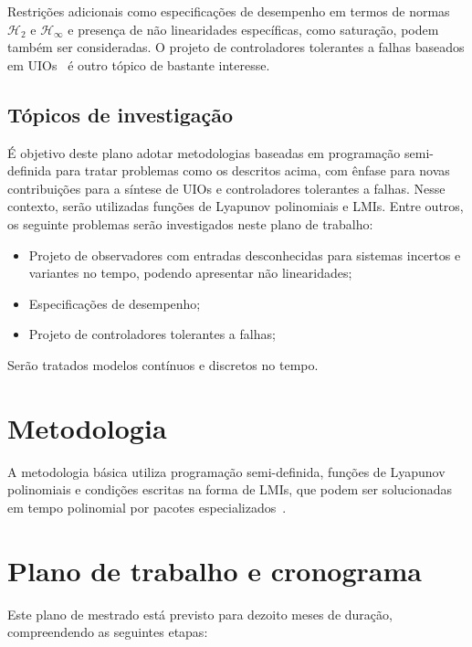 \documentclass[11pt,a4paper]{article}
\begin{document}
Restrições adicionais como especificações de desempenho em termos de
normas $\mathcal{H}_2$ e $\mathcal{H}_\infty$ e presença de não
linearidades específicas, como saturação, podem também ser
consideradas. O projeto de controladores tolerantes a falhas baseados
em UIOs~\cite{BFKPS:00,BSW:01,YCY:05,CH:16} é outro tópico de bastante
interesse.

\subsection{Tópicos de investigação}

É objetivo deste plano adotar metodologias baseadas em programação
semi-definida para tratar problemas como os descritos acima, com
ênfase para novas contribuições para a síntese de UIOs e controladores
tolerantes a falhas. Nesse contexto, serão utilizadas funções de
Lyapunov polinomiais e LMIs. Entre outros, os seguinte problemas serão
investigados neste plano de trabalho:
\begin{itemize}
\item Projeto de observadores com entradas desconhecidas para sistemas
  incertos e variantes no tempo, podendo apresentar não linearidades;

\item Especificações de desempenho;
  
\item Projeto de controladores tolerantes a falhas;
\end{itemize}
Serão tratados modelos contínuos e discretos no tempo.

\section{Metodologia}

A metodologia básica utiliza programação semi-definida, funções de
Lyapunov polinomiais e condições escritas na forma de LMIs, que podem
ser solucionadas em tempo polinomial por pacotes
especializados~\cite{BEFB:94,EN:00,Stu:99,Lof:04,Mos:15}.

\section{Plano de trabalho e cronograma}

Este plano de mestrado está previsto para dezoito meses de duração,
compreendendo as seguintes etapas:
\end{document}
